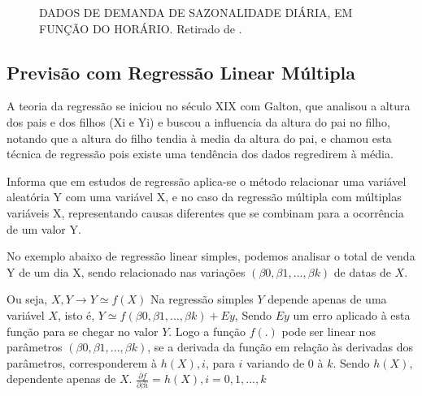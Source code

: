 \documentclass[	12pt, Times, openright, twoside, a4paper, english, brazil]{abntex2}
\begin{document}
          \begin{figure}[!ht]
          	\caption{DADOS DE DEMANDA DE SAZONALIDADE DIÁRIA, EM FUNÇÃO DO HORÁRIO. Retirado de \cite{RUAS2012}.\label{fig:seriesTemporais}}
          \end{figure}

        \subsection{Previsão com Regressão Linear Múltipla}
          A teoria da regressão se iniciou no século XIX com Galton, que analisou a altura dos pais e dos filhos (Xi e Yi) e buscou a influencia da altura do pai no filho, notando que a altura do filho tendia à media da altura do pai, e chamou esta técnica de regressão pois existe uma tendência dos dados regredirem à média.

          \cite{Clarice2011} Informa que em estudos de regressão aplica-se o método relacionar uma variável aleatória Y com uma variável X, e no caso da regressão múltipla com múltiplas variáveis X, representando causas diferentes que se combinam para a ocorrência de um valor Y. 

          No exemplo abaixo de regressão linear simples, podemos analisar o total de venda Y de um dia X, sendo relacionado nas variações $(\beta0, \beta1, ..., \beta k)$ de datas de $X$.

          Ou seja, $X,Y \rightarrow Y \simeq f(X) $
          Na regressão simples $Y$ depende apenas de uma variável $X$, isto é, $Y \simeq f(\beta0, \beta1, ..., \beta k) + Ey$, Sendo $Ey$ um erro aplicado à esta função para se chegar no valor $Y$. Logo a função $f(.)$ pode ser linear nos parâmetros $(\beta0, \beta1, ..., \beta k)$, se a derivada da função em relação às derivadas dos parâmetros, corresponderem à $h(X),i$, para $i$ variando de $0$ à $k$. Sendo $h(X),$ dependente apenas de $X$.
          $\frac {\partial f}{\partial \beta i} = h (X),i = 0,1,...,k $
\end{document}
